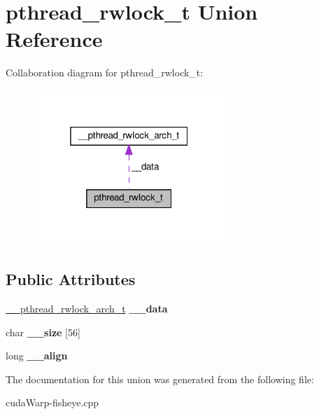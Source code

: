\hypertarget{unionpthread__rwlock__t}{}\section{pthread\+\_\+rwlock\+\_\+t Union Reference}
\label{unionpthread__rwlock__t}


Collaboration diagram for pthread\+\_\+rwlock\+\_\+t\+:\nopagebreak
\begin{figure}[H]
\begin{center}
\leavevmode
\includegraphics[width=205pt]{unionpthread__rwlock__t__coll__graph}
\end{center}
\end{figure}
\subsection*{Public Attributes}
\begin{DoxyCompactItemize}
\item 
\hyperlink{struct____pthread__rwlock__arch__t}{\+\_\+\+\_\+pthread\+\_\+rwlock\+\_\+arch\+\_\+t} {\bfseries \+\_\+\+\_\+data}\hypertarget{unionpthread__rwlock__t_a2a0ec8611ad2d99fd33d02f507a4b200}{}\label{unionpthread__rwlock__t_a2a0ec8611ad2d99fd33d02f507a4b200}

\item 
char {\bfseries \+\_\+\+\_\+size} \mbox{[}56\mbox{]}\hypertarget{unionpthread__rwlock__t_a390fcd365cf1f0f7bf0fb4226359c123}{}\label{unionpthread__rwlock__t_a390fcd365cf1f0f7bf0fb4226359c123}

\item 
long {\bfseries \+\_\+\+\_\+align}\hypertarget{unionpthread__rwlock__t_a3ca4c0a59cd740c642581b7ac920e012}{}\label{unionpthread__rwlock__t_a3ca4c0a59cd740c642581b7ac920e012}

\end{DoxyCompactItemize}


The documentation for this union was generated from the following file\+:\begin{DoxyCompactItemize}
\item 
cuda\+Warp-\/fisheye.\+cpp\end{DoxyCompactItemize}
